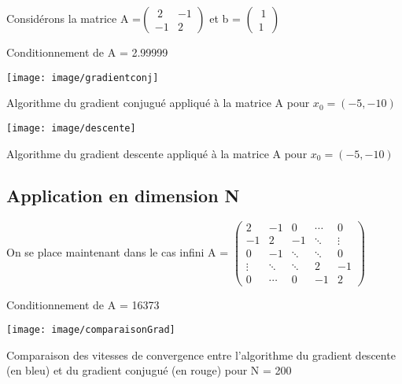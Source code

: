 \documentclass[french]{article}
\begin{document}
Considérons la matrice A =\begin{math}\displaystyle \left(\begin{array}{rr} \ 2 & -1 \\ -1 & 2 \end{array}\right)\end{math}
et b = \begin{math}\displaystyle \left(\begin{array}{rr} \ 1 \\ 1 \end{array}\right)\end{math} 

Conditionnement de A = 2.99999

\noindent\begin{minipage}[t]{1\columnwidth}%
\center

\texttt{[image: image/gradientconj]}

Algorithme du gradient conjugué appliqué à la matrice A pour $x_{0}=(-5,-10)$%
\end{minipage}

\noindent\begin{minipage}[t]{1\columnwidth}%
\center

\texttt{[image: image/descente]}

Algorithme du gradient descente appliqué à la matrice A pour $x_{0}=(-5,-10)$%
\end{minipage}

\subsection{Application en dimension N}

On se place maintenant dans le cas infini A = \begin{math}\displaystyle \begin{pmatrix} 2 & -1 & 0 & \cdots & 0 \\ -1 & 2 & -1 & \ddots & \vdots \\ 0 & -1 & \ddots & \ddots & 0 \\ \vdots & \ddots & \ddots & 2 & -1 \\ 0 & \cdots & 0 & -1 & 2\end{pmatrix}\end{math}

Conditionnement de A = 16373

\noindent\begin{minipage}[t]{1\columnwidth}%
\center

\texttt{[image: image/comparaisonGrad]}

Comparaison des vitesses de convergence entre l'algorithme du gradient
descente (en bleu) et du gradient conjugué (en rouge) pour N = 200%
\end{minipage}\\
\\
\end{document}
